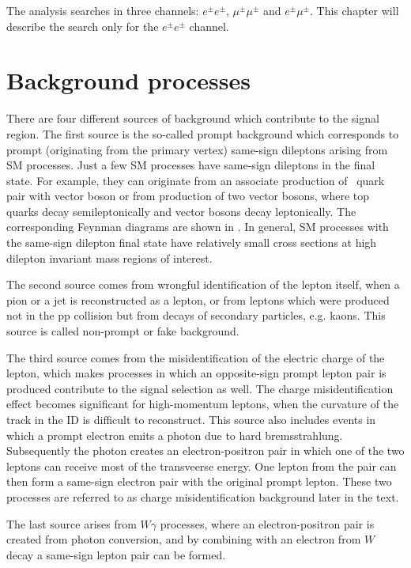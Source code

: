 The analysis searches in three channels: $e^{\pm}e^{\pm}$, $\mu^{\pm}\mu^{\pm}$ and $e^{\pm}\mu^{\pm}$.
This chapter will describe the search only for the $e^{\pm}e^{\pm}$ channel.

\section{Background processes}
\label{sec:wprimeBackgrounds}

There are four different sources of background which contribute to the signal region.
The first source is the so-called prompt background which corresponds to prompt (originating from the primary vertex) same-sign dileptons arising from SM processes.
Just a few SM processes have same-sign dileptons in the final state. 
For example, they can originate from an associate production of \ttbar~quark pair with vector boson or from production of two vector bosons,
where top quarks decay semileptonically and vector bosons decay leptonically.
The corresponding Feynman diagrams are shown in .
In general, SM processes with the same-sign dilepton final state have relatively small cross sections at high dilepton invariant mass regions of interest.

The second source comes from wrongful identification of the lepton itself, when a pion or a jet is reconstructed as a lepton, or from leptons which were produced 
not in the pp collision but from decays of secondary particles, e.g. kaons. This source is called non-prompt or fake background.

The third source comes from the misidentification of the electric charge of the lepton, which makes processes in which an opposite-sign prompt lepton pair is produced 
contribute to the signal selection as well. The charge misidentification effect becomes significant for high-momentum leptons, when the curvature of the track in the ID is difficult to reconstruct. 
This source also includes events in which a prompt electron emits a photon due to hard bremsstrahlung. Subsequently the photon creates an electron-positron pair in which one of the two leptons can receive most of the transveerse energy.
One lepton from the pair can then form a same-sign electron pair with the original prompt lepton. These two processes are referred to as charge misidentification 
background later in the text.

The last source arises from $W\gamma$ processes, where an electron-positron pair is created from photon conversion, and by combining with an electron from $W$ decay
a same-sign lepton pair can be formed. 

